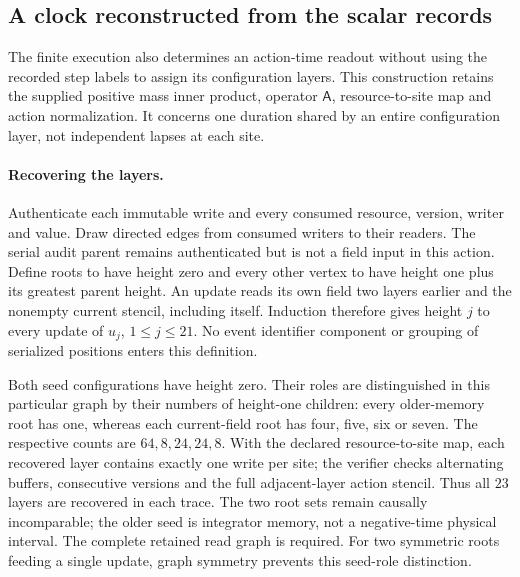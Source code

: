 \subsection{A clock reconstructed from the scalar records}
\label{sec:source-scalar-clock}

The finite execution also determines an action-time readout without using
the recorded step labels to assign its configuration layers. This construction
retains the supplied positive mass inner product, operator $\mathsf A$,
resource-to-site map and action normalization. It concerns one duration
shared by an entire configuration layer, not independent lapses at each site.

\paragraph{Recovering the layers.}
Authenticate each immutable write and every consumed resource, version,
writer and value. Draw directed edges from consumed writers to their readers.
The serial audit parent remains authenticated but is not a field input in
this action. Define roots to have height zero and every other vertex to have
height one plus its greatest parent height. An update reads its own field
two layers earlier and the nonempty current stencil, including itself.
Induction therefore gives height $j$ to every update of $u_j$, $1\le j\le21$.
No event identifier component or grouping of serialized positions enters
this definition.

Both seed configurations have height zero. Their roles are distinguished
in this particular graph by their numbers of height-one children: every
older-memory root has one, whereas each current-field root has four,
five, six or seven. The respective counts are $64,8,24,24,8$. With the
declared resource-to-site map, each recovered layer contains exactly one
write per site; the verifier checks alternating buffers, consecutive
versions and the full adjacent-layer action stencil. Thus all $23$ layers
are recovered in each trace. The two root sets remain causally incomparable;
the older seed is integrator memory, not a negative-time physical interval.
The complete retained read graph is required. For two symmetric roots feeding
a single update, graph symmetry prevents this seed-role distinction.


